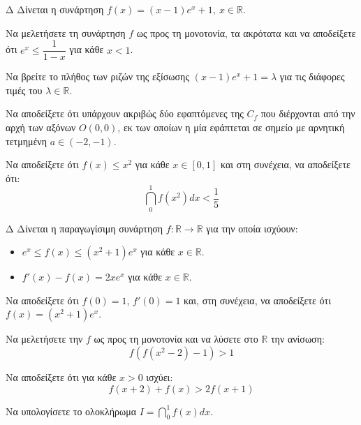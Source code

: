 \begin{thema}{Δ}
Δίνεται η συνάρτηση $f(x) = (x-1)e^x + 1, \ x \in \mathbb{R}$.
\begin{erwthma}
    \item Να μελετήσετε τη συνάρτηση $f$ ως προς τη μονοτονία, τα ακρότατα και να αποδείξετε ότι $e^x \le \dfrac{1}{1-x}$ για κάθε $x < 1$.
    \item Να βρείτε το πλήθος των ριζών της εξίσωσης $(x-1)e^x + 1 = \lambda$ για τις διάφορες τιμές του $\lambda \in \mathbb{R}$.
    \item Να αποδείξετε ότι υπάρχουν ακριβώς δύο εφαπτόμενες της $C_f$ που διέρχονται από την αρχή των αξόνων $O(0,0)$, εκ των οποίων η μία εφάπτεται σε σημείο με αρνητική τετμημένη $a \in (-2, -1)$.
    \item Να αποδείξετε ότι $f(x) \le x^2$ για κάθε $x \in [0, 1]$ και στη συνέχεια, να αποδείξετε ότι:
    \[ \dint_0^1 f(x^2) dx < \frac{1}{5} \]
\end{erwthma}
\end{thema}

\begin{thema}{Δ}
Δίνεται η παραγωγίσιμη συνάρτηση $f: \mathbb{R} \to \mathbb{R}$ για την οποία ισχύουν:
\begin{itemize}
    \item $e^x \le f(x) \le (x^2+1)e^x$ για κάθε $x \in \mathbb{R}$.
    \item $f'(x) - f(x) = 2x e^x$ για κάθε $x \in \mathbb{R}$.
\end{itemize}

\begin{erwthma}
    \item Να αποδείξετε ότι $f(0) = 1$, $f'(0) = 1$ και, στη συνέχεια, να αποδείξετε ότι $f(x) = (x^2 + 1)e^x$.
    \item Να μελετήσετε την $f$ ως προς τη μονοτονία και να λύσετε στο $\mathbb{R}$ την ανίσωση: 
    \[ f\left( f(x^2 - 2) - 1 \right) > 1 \]
    \item Να αποδείξετε ότι για κάθε $x > 0$ ισχύει: 
    \[ f(x+2) + f(x) > 2f(x+1) \]
    \item Να υπολογίσετε το ολοκλήρωμα $\displaystyle I = \dint_0^1 f(x) dx$.
\end{erwthma}
\end{thema}

